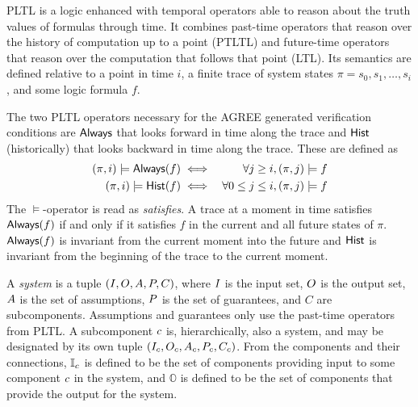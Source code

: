 PLTL is a logic enhanced with temporal operators able to reason about
the truth values of formulas through time.  It combines past-time
operators that reason over the history of computation up to a point
(PTLTL) and future-time operators that reason over the computation
that follows that point (LTL).  Its semantics are defined relative to
a point in time $i$, a finite trace of system states $\pi = s_0, s_1,
\ldots, s_i$, and some logic formula $f$.

The two PLTL operators necessary for the AGREE generated verification
conditions are $\mathsf{Always}$ that looks forward in time along
the trace and $\mathsf{Hist}$ (historically) that looks backward in
time along the trace.  These are defined as
\begin{eqnarray*}
 (\pi, i) \models \mathsf{Always}(f) & \iff & \forall j \ge i, (\pi, j) \models f \\
(\pi, i) \models \mathsf{Hist}(f) & \iff & \forall 0 \le j \le i, (\pi, j) \models f
\end{eqnarray*}
The $\models$-operator is read as \emph{satisfies}.  A trace at a
moment in time satisfies $\mathsf{Always}(f)$ if and only if it satisfies
$f$ in the current and all future states of $\pi$.  $\mathsf{Always}(f)$ is
invariant from the current moment into the future and $\mathsf{Hist}$ is
invariant from the beginning of the trace to the current moment.

A \emph{system} is a tuple $(I, O, A,
P,C)$, where $I$ is the input set, $O$ is the
output set, $A$ is the set of assumptions, $P$ is the
set of guarantees, and $C$ are subcomponents.  Assumptions and guarantees only use the past-time operators from PLTL. A subcomponent
$c$ is, hierarchically, also a system, and may be designated
by its own tuple $(I_{c}, O_{c},
A_{c}, P_{c}, C_c)$.  From the
components and their connections, $\mathbb{I}_{c}$ is defined
to be the set of components providing input to some component
$c$ in the system, and $\mathbb{O}$ is defined to be the set
of components that provide the output for the system.

